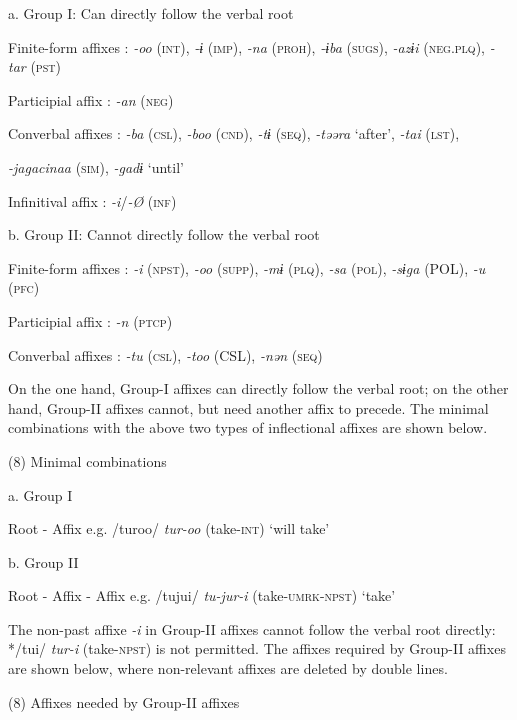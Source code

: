   a.  Group I: Can directly follow the verbal root

    Finite-form affixes  : \textit{{}-oo} (\textsc{int}), \textit{{}-ɨ} (\textsc{imp}), \textit{{}-na} (\textsc{proh}), \textit{{}-ɨba} (\textsc{sugs}), \textit{{}-azɨi} (\textsc{neg}.\textsc{plq}), \textit{{}-tar} (\textsc{pst})

    Participial affix  : \textit{{}-an} (\textsc{neg})

    Converbal affixes  : \textit{{}-ba} (\textsc{csl}), \textit{{}-boo} (\textsc{cnd}), \textit{{}-tɨ} (\textsc{seq}), \textit{{}-təəra} ‘after’, \textit{{}-tai} (\textsc{lst}),

\textit{{}-jagacinaa} (\textsc{sim}), \textit{{}-gadɨ} ‘until’

    Infinitival affix  : \textit{{}-i}/\textit{{}-Ø} (\textsc{inf})

  b.  Group II: Cannot directly follow the verbal root

    Finite-form affixes  : \textit{{}-i} (\textsc{npst}), \textit{{}-oo} (\textsc{supp}), \textit{{}-mɨ} (\textsc{plq}), \textit{{}-sa} (\textsc{pol}), \textit{{}-sɨga} (POL), \textit{{}-u} (\textsc{pfc})

    Participial affix  : \textit{{}-n} (\textsc{ptcp})

    Converbal affixes  : \textit{{}-tu} (\textsc{csl}), \textit{{}-too} (CSL), \textit{{}-nən} (\textsc{seq})

On the one hand, Group-I affixes can directly follow the verbal root; on the other hand, Group-II affixes cannot, but need another affix to precede. The minimal combinations with the above two types of inflectional affixes are shown below.

(8)  Minimal combinations

  a.  Group I                

    Root  {}-  Affix        e.g.  /turoo/  \textit{tur-oo}  (take-\textsc{int})  ‘will take’

  b.  Group II                

    Root  {}-  Affix  {}-  Affix    e.g.  /tujui/  \textit{tu-jur-i}  (take-\textsc{umrk}-\textsc{npst})  ‘take’

The non-past affixe \textit{{}-i} in Group-II affixes cannot follow the verbal root directly: */tui/ \textit{tur-i} (take-\textsc{npst}) is not permitted. The affixes required by Group-II affixes are shown below, where non-relevant affixes are deleted by double lines.

(8)  Affixes needed by Group-II affixes

